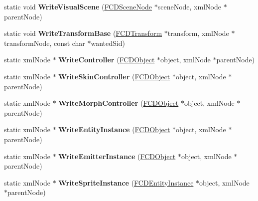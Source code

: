 \begin{DoxyCompactItemize}
\item 
\hypertarget{classFArchiveXML_a3dd267983d86203d3ff1877a22320d3f}{
static void {\bfseries WriteVisualScene} (\hyperlink{classFCDSceneNode}{FCDSceneNode} $\ast$sceneNode, xmlNode $\ast$parentNode)}
\label{classFArchiveXML_a3dd267983d86203d3ff1877a22320d3f}

\item 
\hypertarget{classFArchiveXML_a8359af935af1f842a275061ce869ff38}{
static void {\bfseries WriteTransformBase} (\hyperlink{classFCDTransform}{FCDTransform} $\ast$transform, xmlNode $\ast$transformNode, const char $\ast$wantedSid)}
\label{classFArchiveXML_a8359af935af1f842a275061ce869ff38}

\item 
\hypertarget{classFArchiveXML_aae6c98a03591fd28aec379fa0946a230}{
static xmlNode $\ast$ {\bfseries WriteController} (\hyperlink{classFCDObject}{FCDObject} $\ast$object, xmlNode $\ast$parentNode)}
\label{classFArchiveXML_aae6c98a03591fd28aec379fa0946a230}

\item 
\hypertarget{classFArchiveXML_a0554213a4ab113f7a7b8fa0e1d376bfd}{
static xmlNode $\ast$ {\bfseries WriteSkinController} (\hyperlink{classFCDObject}{FCDObject} $\ast$object, xmlNode $\ast$parentNode)}
\label{classFArchiveXML_a0554213a4ab113f7a7b8fa0e1d376bfd}

\item 
\hypertarget{classFArchiveXML_abfc73128f77a8248c441a941eaebba2d}{
static xmlNode $\ast$ {\bfseries WriteMorphController} (\hyperlink{classFCDObject}{FCDObject} $\ast$object, xmlNode $\ast$parentNode)}
\label{classFArchiveXML_abfc73128f77a8248c441a941eaebba2d}

\item 
\hypertarget{classFArchiveXML_af7fc27ff38234f8237b658620e1ff6e8}{
static xmlNode $\ast$ {\bfseries WriteEntityInstance} (\hyperlink{classFCDObject}{FCDObject} $\ast$object, xmlNode $\ast$parentNode)}
\label{classFArchiveXML_af7fc27ff38234f8237b658620e1ff6e8}

\item 
\hypertarget{classFArchiveXML_ac11151ce93b520019166830033e7989d}{
static xmlNode $\ast$ {\bfseries WriteEmitterInstance} (\hyperlink{classFCDObject}{FCDObject} $\ast$object, xmlNode $\ast$parentNode)}
\label{classFArchiveXML_ac11151ce93b520019166830033e7989d}

\item 
\hypertarget{classFArchiveXML_a10f7dde0be8257ff5a05d9ab57f56d89}{
static xmlNode $\ast$ {\bfseries WriteSpriteInstance} (\hyperlink{classFCDEntityInstance}{FCDEntityInstance} $\ast$object, xmlNode $\ast$parentNode)}
\label{classFArchiveXML_a10f7dde0be8257ff5a05d9ab57f56d89}


\end{DoxyCompactItemize}
